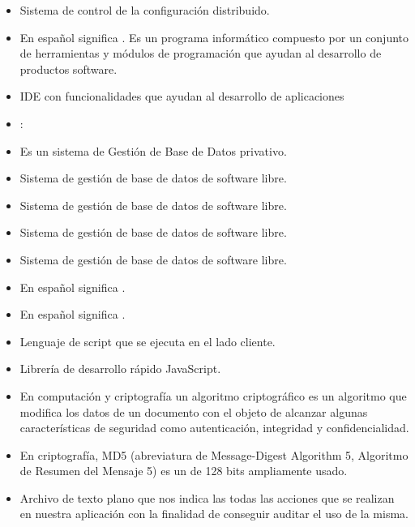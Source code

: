 \begin{itemize}
  \item {} Sistema de control de la configuración
    distribuido.
  \item {} En
    español significa . Es un programa informático compuesto por un
    conjunto de herramientas y módulos de programación que ayudan al
    desarrollo de productos software.
  \item {} IDE con funcionalidades que ayudan al
    desarrollo de aplicaciones 
  \item {}:
  \item {} Es un sistema de Gestión de Base de Datos
    privativo.
  \item {} Sistema de gestión de base de datos de
    software libre.
  \item {} Sistema de gestión de base de datos de
    software libre.
  \item {} Sistema de gestión de base de datos de
    software libre.
  \item {} Sistema de gestión de base de datos de
    software libre.
  \item {} En español significa
    .
  \item {} En español
    significa .
  \item {} Lenguaje de script que se ejecuta en el
    lado cliente.
  \item {} Librería de desarrollo rápido JavaScript.
  \item {} En computación y
    criptografía un algoritmo criptográfico es un algoritmo que
    modifica los datos de un documento con el objeto de alcanzar
    algunas características de seguridad como autenticación,
    integridad y confidencialidad.
  \item {} En criptografía, MD5 (abreviatura de
    Message-Digest Algorithm 5, Algoritmo de Resumen del Mensaje 5) es
    un  de 128 bits ampliamente
    usado.
  \item {} Archivo de texto plano que nos indica las
    todas las  acciones que se realizan en nuestra aplicación con la
    finalidad de conseguir auditar el uso de la misma.


\end{itemize}

